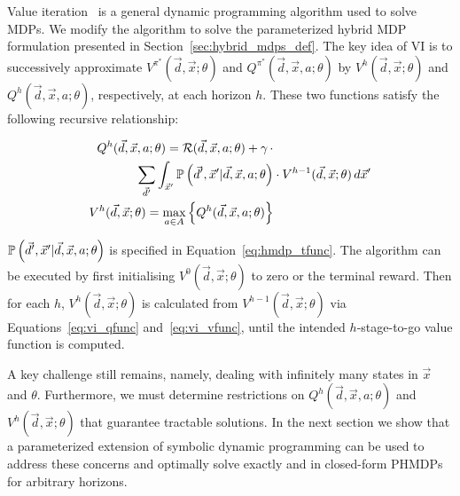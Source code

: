 Value iteration~\parencite{Bellman_PU_1957} is a general dynamic
programming algorithm used to solve MDPs. We modify the algorithm to
solve the parameterized hybrid MDP formulation presented in
Section~\ref{sec:hybrid_mdps_def}. The key idea of VI is to
successively approximate {\footnotesize $V^{\pi^{*}}(\vec{d}, \vec{x};
  \theta)$} and {\footnotesize $Q^{\pi^{*}}(\vec{d}, \vec{x}, a;
  \theta)$} by {\footnotesize $V^{h}(\vec{d}, \vec{x}; \theta)$} and
{\footnotesize $Q^{h}(\vec{d}, \vec{x}, a; \theta)$}, respectively, at
each horizon {\footnotesize$h$}. These two functions satisfy the
following recursive relationship:

{\footnotesize 
    \abovedisplayskip=0pt
    \belowdisplayskip=0pt
    \begin{align}
        Q^{h}(\vec{d}, \vec{x}, a; \theta) = \mathcal{R}(\vec{d}, \vec{x}, a; \theta) + \gamma \, \cdot &  \nonumber \\ 
        \sum_{\vec{d}'} \int_{\vec{x}'} \mathbb{P}\left({\vec{d}', \vec{x}' | \vec{d}, \vec{x}, a; \theta}\right) & \cdot V^{h-1}(\vec{d}, \vec{x}; \theta) \, d\vec{x}'  \label{eq:vi_qfunc} \\
        V^{h}(\vec{d}, \vec{x}; \theta) = \max_{a \in A} \left\{ Q^{h}(\vec{d}, \vec{x}, a; \theta) \right\} & \label{eq:vi_vfunc}
    \end{align}
}%

{\footnotesize $\mathbb{P}\left({\vec{d}', \vec{x}' | \vec{d}, \vec{x}, a;
    \theta}\right)$ } is specified in Equation~\eqref{eq:hmdp_tfunc}. The
algorithm can be executed by first initialising {\footnotesize
  $V^{0}(\vec{d}, \vec{x}; \theta)$} to zero or the terminal
reward. Then for each {\footnotesize$h$}, {\footnotesize
  $V^{h}(\vec{d}, \vec{x}; \theta)$} is calculated from {\footnotesize
  $V^{h-1}(\vec{d}, \vec{x}; \theta)$} via
Equations~\eqref{eq:vi_qfunc} and~\eqref{eq:vi_vfunc}, until the
intended $h$-stage-to-go value function is computed.



A key challenge still remains, namely, dealing with infinitely many
states in {\footnotesize $\vec{x}$} and {\footnotesize
  $\theta$}. Furthermore, we must determine restrictions on
{\footnotesize $Q^{h}(\vec{d}, \vec{x}, a; \theta)$} and
{\footnotesize $V^{h}(\vec{d}, \vec{x}; \theta)$} that guarantee
tractable solutions. In the next section we show that a parameterized
extension of symbolic dynamic programming can be used to address these
concerns and optimally solve exactly and in closed-form PHMDPs for
arbitrary horizons.
